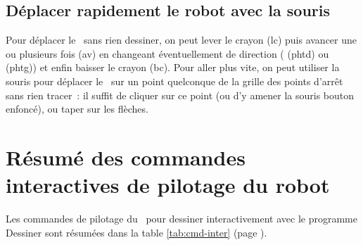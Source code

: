 \subsection{Déplacer rapidement le robot avec la souris}

Pour déplacer le \robot\ sans rien dessiner, on peut lever le crayon
 ({\idt lc}) puis avancer une ou plusieurs fois 
 ({\idt av}) en changeant éventuellement de direction
( ({\idt phtd}) ou  ({\idt phtg})) et enfin baisser
le crayon  ({\idt bc}). Pour aller plus vite, on peut utiliser
la souris pour déplacer le \robot\ sur un point quelconque de la grille 
des points d'arrêt sans rien tracer~: il suffit de cliquer sur ce point (ou d'y
amener la souris bouton enfoncé), ou taper sur les flèches.


\section*{Résumé des commandes interactives \newline de pilotage du robot}

Les commandes de pilotage du \robot\ pour dessiner interactivement
avec le programme {\idt Des\-si\-ner} sont résumées dans la table \ref{tab:cmd-inter} 
(page \pageref{tab:cmd-inter}).

